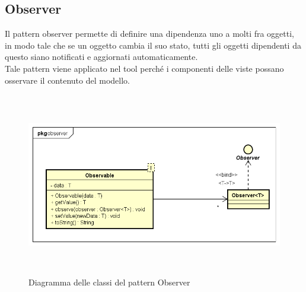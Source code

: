 \subsection*{Observer}\label{subsec:observer}
Il pattern observer permette di definire una dipendenza uno a molti fra oggetti, in modo tale che se un oggetto cambia il suo stato, tutti gli oggetti dipendenti da questo siano notificati e aggiornati automaticamente.\\
Tale pattern viene applicato nel tool perché i componenti delle viste possano osservare il contenuto del modello.
\begin{figure}[H]
    \centering
    \includegraphics[width=13cm, height=8cm]{./immagini/diagrammi_uml/Observer.png}
    \caption{Diagramma delle classi del pattern Observer}\label{fig:observer}
\end{figure}
